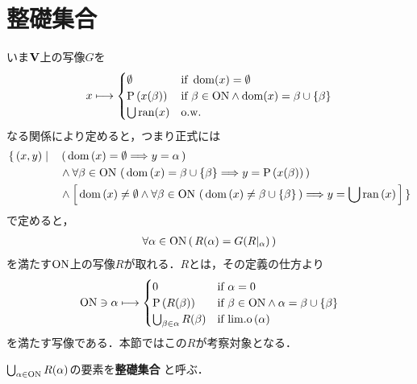 \section{整礎集合}
	いま$\mathbf{V}$上の写像$G$を
	\begin{align}
		x \longmapsto
		\begin{cases}
			\emptyset & \mbox{if } \operatorname{dom}(x) = \emptyset \\
			\operatorname*{P} \left(x(\beta)\right) & \mbox{if } \beta \in \mathrm{ON} \wedge \operatorname{dom}(x) = \beta \cup \{\beta\} \\
			\bigcup \operatorname{ran}(x) & \mathrm{o.w.}
		\end{cases}
	\end{align}
	なる関係により定めると，つまり正式には
	\begin{align}
		\{\, (x,y) \mid \quad &\left(\, \operatorname*{dom} \left(x\right) = \emptyset \Longrightarrow y = \alpha\, \right) \\
		&\wedge \forall \beta \in \mathrm{ON}\, \left(\, \operatorname*{dom} \left(x\right) = \beta \cup \{\beta\} \Longrightarrow y = \operatorname*{P} \left(x(\beta)\right)\, \right) \\
		&\wedge \left[\, \operatorname*{dom} \left(x\right) \neq \emptyset \wedge \forall \beta \in \mathrm{ON}\, \left(\, \operatorname*{dom} \left(x\right) \neq \beta \cup \{\beta\}\, \right)
		\Longrightarrow y = \bigcup \operatorname*{ran} \left(x\right)\, \right]\, \}
	\end{align}
	で定めると，
	\begin{align}
		\forall \alpha \in \mathrm{ON}\, (\, R(\alpha) = G(R|_\alpha)\, )
	\end{align}
	を満たす$\mathrm{ON}$上の写像$R$が取れる．$R$とは，その定義の仕方より
	\begin{align}
		\mathrm{ON} \ni \alpha \longmapsto
		\begin{cases}
			0 & \mbox{if } \alpha = 0 \\
			\operatorname*{P} \left(R(\beta)\right) & \mbox{if } \beta \in \mathrm{ON} \wedge \alpha = \beta \cup \{\beta\} \\
			\bigcup_{\beta \in \alpha} R(\beta) & \mbox{if } \mathrm{lim.o}\left(\alpha\right)
		\end{cases}
	\end{align}
	を満たす写像である．本節ではこの$R$が考察対象となる．
	
	\begin{screen}
		\begin{dfn}[整礎集合]
			$\bigcup_{\alpha \in \mathrm{ON}} R(\alpha)$の要素を{\bf 整礎集合}
			と呼ぶ．
		\end{dfn}
	\end{screen}
	
